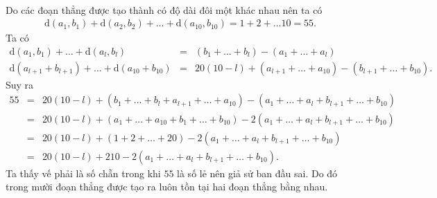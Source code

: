 \begin{ex}
{\begin{enumerate}
	\\ Do các đoạn thẳng được tạo thành có độ dài đôi một khác nhau nên ta có \begin{eqnarray*}
	\mathrm{d}(a_1,b_1) + \mathrm{d}(a_2,b_2) + \ldots +\mathrm{d}(a_{10},b_{10}) = 1+2+\ldots 10=55.
	\end{eqnarray*}
	Ta có 
	\begin{eqnarray*}
	\mathrm{d}(a_1,b_1)+\ldots +\mathrm{d}(a_l,b_l) &=&(b_1+\ldots +b_l) - (a_1+\ldots +a_l) \\\mathrm{d}(a_{l+1}+b_{l+1}) +\ldots +\mathrm{d}(a_{10}+b_{10}) &=& 20(10-l) + (a_{l+1}+\ldots +a_{10}) -(b_{l+1}+\ldots +b_{10}).
	\end{eqnarray*}
Suy ra \begin{eqnarray*}
55 &=& 20(10-l) +\left(b_1+\ldots+b_l +a_{l+1}+\ldots+a_{10}\right) - \left( a_1+\ldots +a_l+ b_{l+1}+\ldots +b_{10}\right) \\
&=&20(10-l) + \left(a_1+\ldots +a_{10}+b_1 +\ldots +b_{10}\right) -2 \left( a_1+\ldots +a_l+ b_{l+1}+\ldots +b_{10}\right) \\
&=& 20(10-l) + \left(1+2+\ldots +20\right) -2 \left( a_1+\ldots +a_l+ b_{l+1}+\ldots +b_{10}\right) \\
&=& 20(10-l) +210 -2 \left( a_1+\ldots +a_l+ b_{l+1}+\ldots +b_{10}\right).
\end{eqnarray*}
Ta thấy vế phải là số chẵn trong khi $55$ là số lẻ nên giả sử ban đầu sai. Do đó trong mười đoạn thẳng được tạo ra luôn tồn tại hai đoạn thẳng bằng nhau.
\end{enumerate}}
\end{ex}
